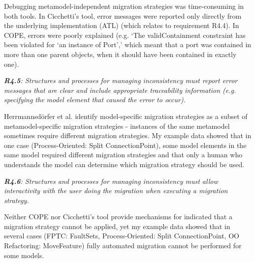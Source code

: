 \documentclass[a4paper]{article}
\begin{document}

% 


Debugging metamodel-independent migration strategies was time-consuming in both tools. In Cicchetti's tool, error messages were reported only directly from the underlying implementation (ATL) (which relates to requirement R4.4). In COPE, errors were poorly explained (e.g. ‘The validContainment constraint has been violated for ‘an instance of Port’,’ which meant that a port was contained in more than one parent objects, when it should have been contained in exactly one).

\emph{\textbf{R4.5}: Structures and processes for managing inconsistency must report error messages that are clear and include appropriate traceability information (e.g. specifying the model element that caused the error to occur).}


Herrmannsd\"{o}rfer et al. identify model-specific migration strategies as a subset of metamodel-specific migration strategies - instances of the same metamodel sometimes require different migration strategies. My example data showed that in one case (Process-Oriented: Split ConnectionPoint), some model elements in the same model required different migration strategies and that only a human who understands the model can determine which migration strategy should be used.

\emph{\textbf{R4.6}: Structures and processes for managing inconsistency must allow interactivity with the user doing the migration when executing a migration strategy.}


Neither COPE nor Cicchetti's tool provide mechanisms for indicated that a migration strategy cannot be applied, yet my example data showed that in several cases (FPTC: FaultSets, Process-Oriented: Split ConnectionPoint, OO Refactoring: MoveFeature) fully automated migration cannot be performed for some models. 
\end{document}
